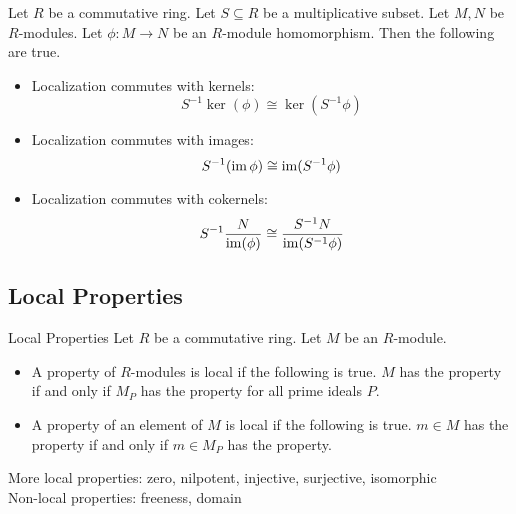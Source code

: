 \documentclass[a4paper]{article}
\begin{document}
\begin{lmm}{}{} Let $R$ be a commutative ring. Let $S\subseteq R$ be a multiplicative subset. Let $M,N$ be $R$-modules. Let $\phi:M\to N$ be an $R$-module homomorphism. Then the following are true. 
\begin{itemize}
\item Localization commutes with kernels: $$S^{-1}\ker(\phi)\cong\ker(S^{-1}\phi)$$
\item Localization commutes with images: $$S^{-1}(\operatorname{im}\phi)\cong\operatorname{im}(S^{-1}\phi)$$
\item Localization commutes with cokernels: $$S^{-1}\frac{N}{\operatorname{im}(\phi)}\cong\frac{S^{-1}N}{\operatorname{im}(S^{-1}\phi)}$$
\end{itemize}
\end{lmm}

\subsection{Local Properties}
\begin{defn}{Local Properties}{} Let $R$ be a commutative ring. Let $M$ be an $R$-module. 
\begin{itemize}
\item A property of $R$-modules is local if the following is true. $M$ has the property if and only if $M_P$ has the property for all prime ideals $P$. 
\item A property of an element of $M$ is local if the following is true. $m\in M$ has the property if and only if $m\in M_P$ has the property. 
\end{itemize}
\end{defn}

More local properties: zero, nilpotent, injective, surjective, isomorphic\\
Non-local properties: freeness, domain
\end{document}
